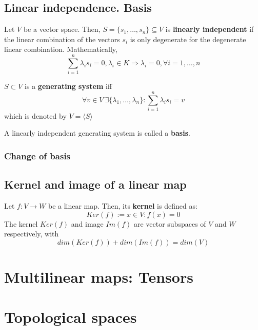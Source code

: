 \documentclass[root.tex]{subfiles}
\begin{document}
  \section{Linear independence. Basis}
  \begin{mydef} 
    Let $V$ be a vector space. Then, $S = \lbrace{s_1, \ldots, s_n \rbrace}\subseteq V$ is \textbf{linearly independent} if the linear combination of the vectors $s_i$ is only degenerate for the degenerate linear combination. Mathematically,
    $$
    \sum_{i=1}^n \lambda_i s_i = 0, \lambda_i \in K \Rightarrow \lambda_i = 0, \forall i = 1, \ldots, n
    $$
  \end{mydef} 
  \begin{mydef}
    $S\subset V$ is a \textbf{generating system} iff
    $$
    \forall v \in V\ \exists \lbrace \lambda_1, \ldots, \lambda_n \rbrace : \sum_{i=1}^n \lambda_i s_i = v
    $$
    which is denoted by $V = \langle S \rangle$
  \end{mydef}
  \begin{mydef}
    A linearly independent generating system is called a \textbf{basis}.
  \end{mydef} 
  \subsection{Change of basis}

  \section{Kernel and image of a linear map}
  \begin{mydef}
    Let $f:V\rightarrow W$ be a linear map. Then, its \textbf{kernel} is defined as:
    $$
      Ker(f) := x \in V : f(x) = 0
    $$
    The kernel $Ker(f)$ and image $Im(f)$ are vector subspaces of $V$ and $W$ respectively, with
    $$
    dim(Ker(f)) + dim(Im(f)) = dim(V)
    $$
  \end{mydef} 


\chapter{Multilinear maps: Tensors}%


\chapter{Topological spaces}%
\end{document}
